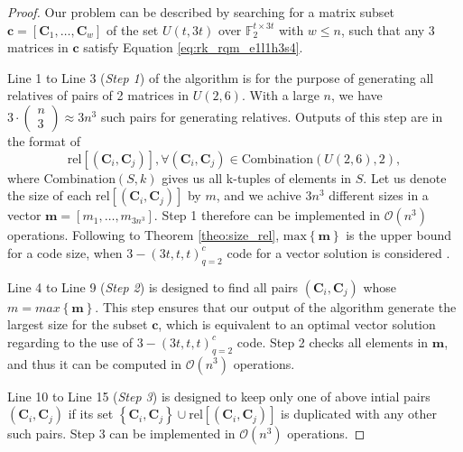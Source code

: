 \begin{proof}
Our problem can be described by searching for a matrix subset $\boldsymbol{c}=\left[\boldsymbol{C}_{1},\ldots,\boldsymbol{C}_{w}\right]$
of the set $U(t,3t)$ over $\ensuremath{\mathbb{F}}_{2}^{t\times3t}$
with $w\leq n$, such that any 3 matrices in $\boldsymbol{c}$ satisfy
Equation \ref{eq:rk_rqm_e1l1h3s4}. 

Line 1 to Line 3 (\textit{Step 1}) of the algorithm is for the purpose
of generating all relatives of pairs of 2 matrices in $U(2,6)$. With
a large $n$, we have $3\cdot\left(\begin{array}{c}
n\\
3
\end{array}\right)\approx3n^{3}$ such pairs for generating relatives. Outputs of this step are in
the format of 
\[
\mathrm{rel}\left[\left(\boldsymbol{C}_{i},\boldsymbol{C}_{j}\right)\right],\forall\left(\boldsymbol{C}_{i},\boldsymbol{C}_{j}\right)\in\mathrm{Combination}\left(U(2,6),2\right),
\]
where $\mathrm{Combination}(S,k)$ gives us all k-tuples of elements
in $S$. Let us denote the size of each $\mathrm{rel}\left[\left(\boldsymbol{C}_{i},\boldsymbol{C}_{j}\right)\right]$
by $m$, and we achive $3n^{3}$ different sizes in a vector $\boldsymbol{m}=\left[m_{1},\ldots,m_{3n^{3}}\right].$
Step 1 therefore can be implemented in $\mathcal{O}\left(n^{3}\right)$
operations. Following to Theorem \ref{theo:size_rel}, $\mathrm{max}\left\{ \boldsymbol{m}\right\} $
is the upper bound for a code size, when $3-\left(3t,t,t\right)_{q=2}^{c}$
code for a vector solution is considered \cite[Sec. V-D]{Zhang:2019}.

Line 4 to Line 9 (\textit{Step 2}) is designed to find all pairs $\left(\boldsymbol{C}_{i},\boldsymbol{C}_{j}\right)$
whose $m=max\left\{ \boldsymbol{m}\right\} $. This step ensures that
our output of the algorithm generate the largest size for the subset
$\boldsymbol{c}$, which is equivalent to an optimal vector solution
regarding to the use of $3-\left(3t,t,t\right)_{q=2}^{c}$ code. Step
2 checks all elements in $\boldsymbol{m}$, and thus it can be computed
in $\mathcal{O}\left(n^{3}\right)$ operations.

Line 10 to Line 15 (\textit{Step 3}) is designed to keep only one
of above intial pairs $\left(\boldsymbol{C}_{i},\boldsymbol{C}_{j}\right)$
if its set $\left\{ \boldsymbol{C}_{i},\boldsymbol{C}_{j}\right\} \cup\mathrm{rel}\left[\left(\boldsymbol{C}_{i},\boldsymbol{C}_{j}\right)\right]$
is duplicated with any other such pairs. Step 3 can be implemented
in $\mathcal{O}\left(n^{3}\right)$ operations.


\end{proof}
